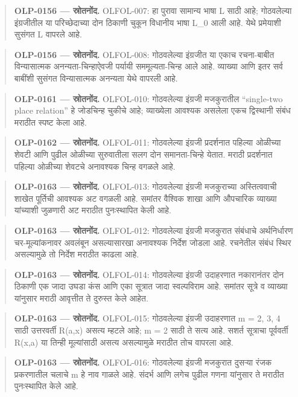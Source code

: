\begin{quote}\small\textbf{OLP-0156 — स्रोतनोंद.} OLFOL-007: हा पुरावा सामान्य भाषा L साठी आहे; गोठवलेल्या इंग्रजीतील या परिच्छेदाच्या दोन ठिकाणी चुकून विधानीय भाषा L\_0 आली आहे. येथे प्रमेयाशी सुसंगत L वापरले आहे.\end{quote}
\begin{quote}\small\textbf{OLP-0156 — स्रोतनोंद.} OLFOL-008: गोठवलेल्या इंग्रजीत या एकाच रचना-बाबीत विन्यासात्मक अनन्यता-चिन्हाऐवजी पर्यायी सममूल्यता-चिन्ह आले आहे. व्याख्या आणि इतर सर्व बाबींशी सुसंगत विन्यासात्मक अनन्यता येथे वापरली आहे.\end{quote}
\begin{quote}\small\textbf{OLP-0161 — स्रोतनोंद.} OLFOL-010: गोठवलेल्या इंग्रजी मजकुरातील ``single-two place relation'' हे जोडचिन्ह चुकीचे आहे; व्याख्येला आवश्यक असलेला एकच द्विस्थानी संबंध मराठीत स्पष्ट केला आहे.\end{quote}
\begin{quote}\small\textbf{OLP-0162 — स्रोतनोंद.} OLFOL-011: गोठवलेल्या इंग्रजी प्रदर्शनात पहिल्या ओळीच्या शेवटी आणि पुढील ओळीच्या सुरुवातीला सलग दोन समानता-चिन्हे येतात. मराठी प्रदर्शनात पहिल्या ओळीच्या शेवटचे अनावश्यक चिन्ह वगळले आहे.\end{quote}
\begin{quote}\small\textbf{OLP-0163 — स्रोतनोंद.} OLFOL-013: गोठवलेल्या इंग्रजी मजकुराच्या अस्तित्ववाची शाखेत पूर्तिची आवश्यक अट वगळली आहे. समांतर वैश्विक शाखा आणि औपचारिक व्याख्या यांच्याशी जुळणारी अट मराठीत पुनःस्थापित केली आहे.\end{quote}
\begin{quote}\small\textbf{OLP-0163 — स्रोतनोंद.} OLFOL-012: गोठवलेल्या इंग्रजी मजकुरात संबंधाचे अर्थनिर्धारण चर-मूल्यांकनावर अवलंबून असल्यासारखा अनावश्यक निर्देश जोडला आहे. रचनेतील संबंध स्थिर असल्यामुळे तो निर्देश मराठीत काढला आहे.\end{quote}
\begin{quote}\small\textbf{OLP-0163 — स्रोतनोंद.} OLFOL-014: गोठवलेल्या इंग्रजी उदाहरणात नकारानंतर दोन ठिकाणी एक जादा उघडा कंस आणि एका सूत्रात जादा स्वल्पविराम आहे. समांतर सूत्रे व व्याख्या यांनुसार मराठी आवृत्तीत ते दुरुस्त केले आहेत.\end{quote}
\begin{quote}\small\textbf{OLP-0163 — स्रोतनोंद.} OLFOL-015: गोठवलेल्या इंग्रजी उदाहरणात m = 2, 3, 4 साठी उत्तरवर्ती R(a,x) असत्य म्हटले आहे; m = 2 साठी ते सत्य आहे. सशर्त सूत्राचा पूर्ववर्ती R(x,a) या तिन्ही मूल्यांसाठी असत्य असल्यामुळे मराठीत तोच वापरला आहे.\end{quote}
\begin{quote}\small\textbf{OLP-0163 — स्रोतनोंद.} OLFOL-016: गोठवलेल्या इंग्रजी मजकुरात दुसऱ्या रंजक प्रकरणातील चलाचे m हे नाव गाळले आहे. संदर्भ आणि लगेच पुढील गणना यांनुसार ते मराठीत पुनःस्थापित केले आहे.\end{quote}
